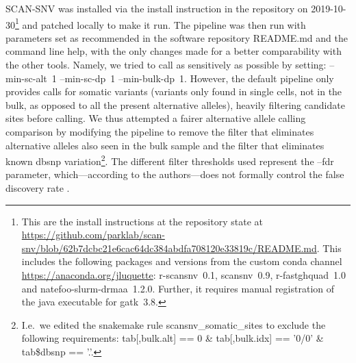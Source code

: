 \documentclass[authoryear,preprint,11pt]{scrartcl}
\begin{document}
SCAN-SNV \citep{luquette_identification_2019} was installed via the install instruction in the repository on 2019-10-30\footnote{
 This are the install instructions at the repository state at \url{https://github.com/parklab/scan-snv/blob/62b7dcbc21e6cac64dc384abdfa708120e33819c/README.md}.
 This includes the following packages and versions from the custom conda channel \url{https://anaconda.org/jluquette}:
 {\ttfamily r-scansnv~0.1}, {\ttfamily scansnv~0.9}, {\ttfamily r-fastghquad~1.0} and {\ttfamily natefoo-slurm-drmaa~1.2.0}.
 Further, it requires manual registration of the java executable for {\ttfamily gatk~3.8}.
} and patched locally to make it run.
The pipeline was then run with parameters set as recommended in the software repository {\ttfamily README.md} and the command line help, with the only changes made for a better comparability with the other tools.
Namely, we tried to call as sensitively as possible by setting: {\ttfamily  --min-sc-alt~1 --min-sc-dp~1 --min-bulk-dp~1}.
However, the default pipeline only provides calls for somatic variants (variants only found in single cells, not in the bulk, as opposed to all the present alternative alleles), heavily filtering candidate sites before calling.
We thus attempted a fairer alternative allele calling comparison by modifying the pipeline to remove the filter that eliminates alternative alleles also seen in the bulk sample and the filter that eliminates known dbsnp variation\footnote{
 I.e.~we edited the snakemake {\ttfamily rule scansnv\_somatic\_sites} to exclude the following requirements:
 {\ttfamily tab[,bulk.alt] == 0 \& tab[,bulk.idx] == '0/0' \& tab\$dbsnp == '.'}.
}.
The different filter thresholds used represent the {\ttfamily --fdr} parameter, which---according to the authors---does not formally control the false discovery rate \citep{luquette_identification_2019}.\\
\end{document}

